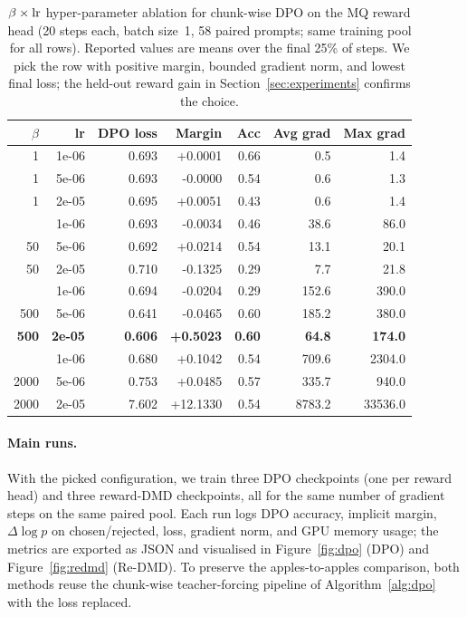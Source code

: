 \documentclass{article}
\begin{document}
\begin{table}[t]
\centering
\caption{$\beta\times{\rm lr}$ hyper-parameter ablation for chunk-wise DPO on the MQ reward head (20 steps each, batch size~1, 58 paired prompts; same training pool for all rows). Reported values are means over the final 25\% of steps. We pick the row with positive margin, bounded gradient norm, and lowest final loss; the held-out reward gain in Section~\ref{sec:experiments} confirms the choice.}
\label{tab:abl}
\begin{tabular}{rrrrrrr}
\toprule
$\beta$ & lr & DPO loss & Margin & Acc & Avg grad & Max grad \\
\midrule
1 & 1e-06 & 0.693 & +0.0001 & 0.66 & 0.5 & 1.4 \\
1 & 5e-06 & 0.693 & -0.0000 & 0.54 & 0.6 & 1.3 \\
1 & 2e-05 & 0.695 & +0.0051 & 0.43 & 0.6 & 1.4 \\
\addlinespace[2pt]
50 & 1e-06 & 0.693 & -0.0034 & 0.46 & 38.6 & 86.0 \\
50 & 5e-06 & 0.692 & +0.0214 & 0.54 & 13.1 & 20.1 \\
50 & 2e-05 & 0.710 & -0.1325 & 0.29 & 7.7 & 21.8 \\
\addlinespace[2pt]
500 & 1e-06 & 0.694 & -0.0204 & 0.29 & 152.6 & 390.0 \\
500 & 5e-06 & 0.641 & -0.0465 & 0.60 & 185.2 & 380.0 \\
\textbf{500} & \textbf{2e-05} & \textbf{0.606} & \textbf{+0.5023} & \textbf{0.60} & \textbf{64.8} & \textbf{174.0} \\
\addlinespace[2pt]
2000 & 1e-06 & 0.680 & +0.1042 & 0.54 & 709.6 & 2304.0 \\
2000 & 5e-06 & 0.753 & +0.0485 & 0.57 & 335.7 & 940.0 \\
2000 & 2e-05 & 7.602 & +12.1330 & 0.54 & 8783.2 & 33536.0 \\
\bottomrule
\end{tabular}
\end{table}

\paragraph{Main runs.} With the picked configuration, we train three DPO checkpoints (one per reward head) and three reward-DMD checkpoints, all for the same number of gradient steps on the same paired pool. Each run logs DPO accuracy, implicit margin, $\Delta\log p$ on chosen/rejected, loss, gradient norm, and GPU memory usage; the metrics are exported as JSON and visualised in Figure~\ref{fig:dpo} (DPO) and Figure~\ref{fig:redmd} (Re-DMD). To preserve the apples-to-apples comparison, both methods reuse the chunk-wise teacher-forcing pipeline of Algorithm~\ref{alg:dpo} with the loss replaced.
\end{document}
